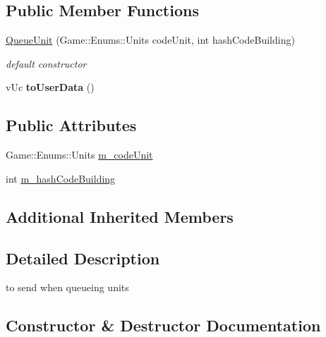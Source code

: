 \subsection*{Public Member Functions}
\begin{DoxyCompactItemize}
\item 
\hyperlink{class_network_1_1_messages_1_1_queue_unit_acc8553a19d7f8063479ce0d57cf176fa}{Queue\+Unit} (Game\+::\+Enums\+::\+Units code\+Unit, int hash\+Code\+Building)
\begin{DoxyCompactList}\small\item\em default constructor \end{DoxyCompactList}\item 
\mbox{\label{class_network_1_1_messages_1_1_queue_unit_a256830304567ae0998a177c9c9568e07}} 
v\+Uc {\bfseries to\+User\+Data} ()
\end{DoxyCompactItemize}
\subsection*{Public Attributes}
\begin{DoxyCompactItemize}
\item 
Game\+::\+Enums\+::\+Units \hyperlink{class_network_1_1_messages_1_1_queue_unit_a04042926f8ec1ba5234f80a1ca2755d3}{m\+\_\+code\+Unit}
\item 
int \hyperlink{class_network_1_1_messages_1_1_queue_unit_a72a79f7b1141067994d724114906d018}{m\+\_\+hash\+Code\+Building}
\end{DoxyCompactItemize}
\subsection*{Additional Inherited Members}


\subsection{Detailed Description}
to send when queueing units 

\subsection{Constructor \& Destructor Documentation}
\mbox{\label{class_network_1_1_messages_1_1_queue_unit_acc8553a19d7f8063479ce0d57cf176fa}} 
